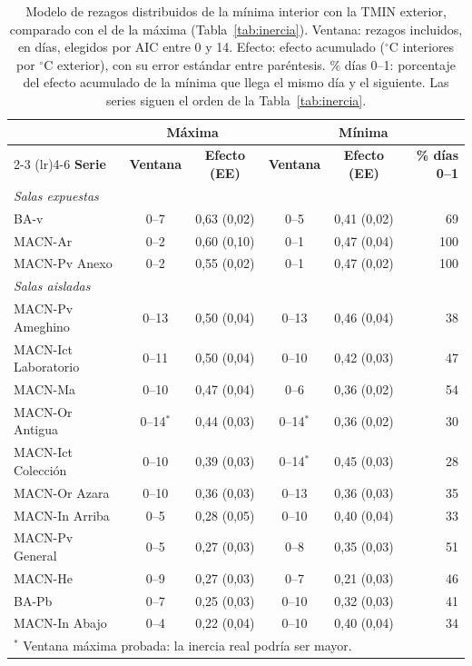 \documentclass[11pt,a4paper]{article}
\begin{document}
\begin{table}[htbp]
\centering
\footnotesize
\setlength{\tabcolsep}{4pt}
\caption{Modelo de rezagos distribuidos de la mínima interior con la TMIN exterior, comparado con el de la máxima (Tabla~\ref{tab:inercia}). Ventana: rezagos incluidos, en días, elegidos por AIC entre 0 y 14. Efecto: efecto acumulado ($^\circ$C interiores por $^\circ$C exterior), con su error estándar entre paréntesis. \% días 0--1: porcentaje del efecto acumulado de la mínima que llega el mismo día y el siguiente. Las series siguen el orden de la Tabla~\ref{tab:inercia}.}
\label{tab:minima}
\begin{tabular}{l c c c c r}
\toprule
 & \multicolumn{2}{c}{\textbf{Máxima}} & \multicolumn{3}{c}{\textbf{Mínima}} \\
\cmidrule(lr){2-3} \cmidrule(lr){4-6}
\textbf{Serie} & \textbf{Ventana} & \textbf{Efecto (EE)} & \textbf{Ventana} & \textbf{Efecto (EE)} & \textbf{\% días 0--1} \\
\midrule
\multicolumn{6}{l}{\textit{Salas expuestas}} \\
BA-v                 & 0--7  & 0{,}63 (0{,}02) & 0--5  & 0{,}41 (0{,}02) & 69 \\
MACN-Ar              & 0--2  & 0{,}60 (0{,}10) & 0--1  & 0{,}47 (0{,}04) & 100 \\
MACN-Pv Anexo        & 0--2  & 0{,}55 (0{,}02) & 0--1  & 0{,}47 (0{,}02) & 100 \\
\midrule
\multicolumn{6}{l}{\textit{Salas aisladas}} \\
MACN-Pv Ameghino     & 0--13 & 0{,}50 (0{,}04) & 0--13 & 0{,}46 (0{,}04) & 38 \\
MACN-Ict Laboratorio & 0--11 & 0{,}50 (0{,}04) & 0--10 & 0{,}42 (0{,}03) & 47 \\
MACN-Ma              & 0--10 & 0{,}47 (0{,}04) & 0--6  & 0{,}36 (0{,}02) & 54 \\
MACN-Or Antigua      & 0--14$^{*}$ & 0{,}44 (0{,}03) & 0--14$^{*}$ & 0{,}36 (0{,}02) & 30 \\
MACN-Ict Colección   & 0--10 & 0{,}39 (0{,}03) & 0--14$^{*}$ & 0{,}45 (0{,}03) & 28 \\
MACN-Or Azara        & 0--10 & 0{,}36 (0{,}03) & 0--13 & 0{,}36 (0{,}03) & 35 \\
MACN-In Arriba       & 0--5  & 0{,}28 (0{,}05) & 0--10 & 0{,}40 (0{,}04) & 33 \\
MACN-Pv General      & 0--5  & 0{,}27 (0{,}03) & 0--8  & 0{,}35 (0{,}03) & 51 \\
MACN-He              & 0--9  & 0{,}27 (0{,}03) & 0--7  & 0{,}21 (0{,}03) & 46 \\
BA-Pb                & 0--7  & 0{,}25 (0{,}03) & 0--10 & 0{,}32 (0{,}03) & 41 \\
MACN-In Abajo        & 0--4  & 0{,}22 (0{,}04) & 0--10 & 0{,}40 (0{,}04) & 34 \\
\bottomrule
\multicolumn{6}{l}{\footnotesize $^{*}$ Ventana máxima probada: la inercia real podría ser mayor.}
\end{tabular}
\end{table}
\end{document}
